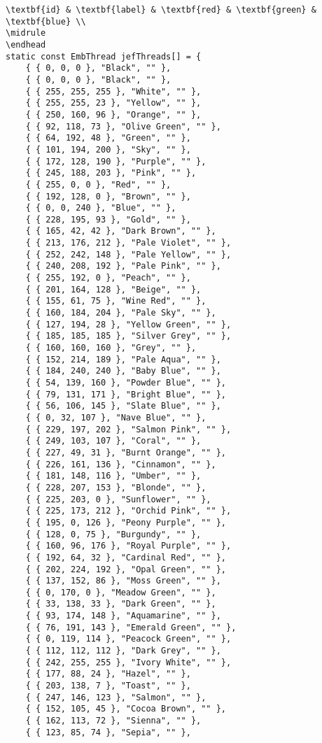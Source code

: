 \documentclass[onesize, a4paper]{refart}
\begin{document}
\begin{verbatim}
\textbf{id} & \textbf{label} & \textbf{red} & \textbf{green} & \textbf{blue} \\
\midrule
\endhead
static const EmbThread jefThreads[] = {
    { { 0, 0, 0 }, "Black", "" },
    { { 0, 0, 0 }, "Black", "" },
    { { 255, 255, 255 }, "White", "" },
    { { 255, 255, 23 }, "Yellow", "" },
    { { 250, 160, 96 }, "Orange", "" },
    { { 92, 118, 73 }, "Olive Green", "" },
    { { 64, 192, 48 }, "Green", "" },
    { { 101, 194, 200 }, "Sky", "" },
    { { 172, 128, 190 }, "Purple", "" },
    { { 245, 188, 203 }, "Pink", "" },
    { { 255, 0, 0 }, "Red", "" },
    { { 192, 128, 0 }, "Brown", "" },
    { { 0, 0, 240 }, "Blue", "" },
    { { 228, 195, 93 }, "Gold", "" },
    { { 165, 42, 42 }, "Dark Brown", "" },
    { { 213, 176, 212 }, "Pale Violet", "" },
    { { 252, 242, 148 }, "Pale Yellow", "" },
    { { 240, 208, 192 }, "Pale Pink", "" },
    { { 255, 192, 0 }, "Peach", "" },
    { { 201, 164, 128 }, "Beige", "" },
    { { 155, 61, 75 }, "Wine Red", "" },
    { { 160, 184, 204 }, "Pale Sky", "" },
    { { 127, 194, 28 }, "Yellow Green", "" },
    { { 185, 185, 185 }, "Silver Grey", "" },
    { { 160, 160, 160 }, "Grey", "" },
    { { 152, 214, 189 }, "Pale Aqua", "" },
    { { 184, 240, 240 }, "Baby Blue", "" },
    { { 54, 139, 160 }, "Powder Blue", "" },
    { { 79, 131, 171 }, "Bright Blue", "" },
    { { 56, 106, 145 }, "Slate Blue", "" },
    { { 0, 32, 107 }, "Nave Blue", "" },
    { { 229, 197, 202 }, "Salmon Pink", "" },
    { { 249, 103, 107 }, "Coral", "" },
    { { 227, 49, 31 }, "Burnt Orange", "" },
    { { 226, 161, 136 }, "Cinnamon", "" },
    { { 181, 148, 116 }, "Umber", "" },
    { { 228, 207, 153 }, "Blonde", "" },
    { { 225, 203, 0 }, "Sunflower", "" },
    { { 225, 173, 212 }, "Orchid Pink", "" },
    { { 195, 0, 126 }, "Peony Purple", "" },
    { { 128, 0, 75 }, "Burgundy", "" },
    { { 160, 96, 176 }, "Royal Purple", "" },
    { { 192, 64, 32 }, "Cardinal Red", "" },
    { { 202, 224, 192 }, "Opal Green", "" },
    { { 137, 152, 86 }, "Moss Green", "" },
    { { 0, 170, 0 }, "Meadow Green", "" },
    { { 33, 138, 33 }, "Dark Green", "" },
    { { 93, 174, 148 }, "Aquamarine", "" },
    { { 76, 191, 143 }, "Emerald Green", "" },
    { { 0, 119, 114 }, "Peacock Green", "" },
    { { 112, 112, 112 }, "Dark Grey", "" },
    { { 242, 255, 255 }, "Ivory White", "" },
    { { 177, 88, 24 }, "Hazel", "" },
    { { 203, 138, 7 }, "Toast", "" },
    { { 247, 146, 123 }, "Salmon", "" },
    { { 152, 105, 45 }, "Cocoa Brown", "" },
    { { 162, 113, 72 }, "Sienna", "" },
    { { 123, 85, 74 }, "Sepia", "" },

\end{verbatim}
\end{document}
